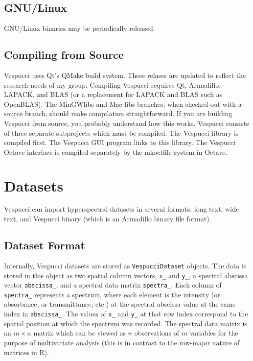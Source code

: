 \documentclass[12pt]{achemso} %
\begin{document}
\subsection{GNU/Linux} GNU/Linux binaries may be periodically released.
\subsection{Compiling from Source} Vespucci uses Qt's QMake build system. These
relases are updated to reflect the research needs of my group. Compiling
Vespucci requires Qt, Armadillo, LAPACK, and BLAS (or a replacement for LAPACK
and BLAS such as OpenBLAS). The MinGW\textunderscore libs and Mac\textunderscore
libs branches, when checked-out with a source branch, should make compilation
straightforward. If you are building Vespucci from source, you probably
understand how this works. Vespucci consists of three separate subprojects which
must be compiled. The Vespucci library is compiled first. The Vespucci GUI
program links to this library. The Vespucci Octave interface is compiled
separately by the mkoctfile system in Octave.


\section{Datasets} Vespucci can import hyperspectral datasets in
several formats: long text, wide text, and Vespucci binary (which is an
Armadillo binary file format).

\subsection{Dataset Format} Internally, Vespucci datasets are stored as
\texttt{VespucciDataset} objects. The data is stored in this object as two
spatial column vectors, \texttt{x\_} and \texttt{y\_}, a spectral abscissa
vector \texttt{abscissa\_}, and a spectral data matrix \texttt{spectra\_}. Each
column of \texttt{spectra\_} represents a spectrum, where each element is the
intensity (or absorbance, or transmittance, etc.) at the spectral abscissa value
at the same index in \texttt{abscissa\_}. The values of \texttt{x\_} and
\texttt{y\_} at that row index correspond to the spatial position at which the
spectrum was recorded. The spectral data matrix is an \(m \times n\) matrix
which can be viewed as \(n\) observations of \(m\) variables for the purpose of
multivariate analysis (this is in contrast to the row-major nature of matrices
in R).
\end{document}
